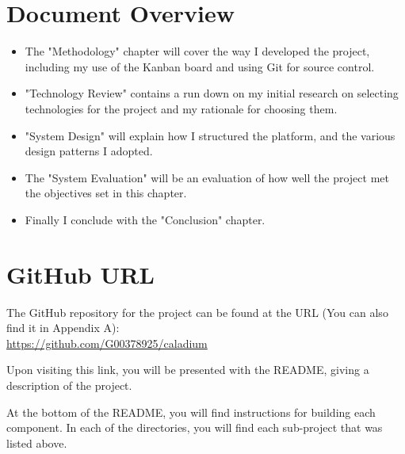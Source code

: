 
\section{Document Overview}
\begin{itemize}
  \item The "Methodology" chapter will cover the way I developed the project,
  including my use of the Kanban board and using Git for source control.
  \item "Technology Review" contains a run down on my initial research on selecting
  technologies for the project and my rationale for choosing them.
  \item "System Design" will explain how I structured the platform,
  and the various design patterns I adopted.
  \item The "System Evaluation" will be an evaluation of how well
  the project met the objectives set in this chapter.
  \item Finally I conclude with the "Conclusion" chapter.
\end{itemize}

\section{GitHub URL}
The GitHub repository for the project can be found at the URL
(You can also find it in Appendix A):\\
\href{https://github.com/G00378925/caladium}{https://github.com/G00378925/caladium}

Upon visiting this link,
you will be presented with the README,
giving a description of the project.

At the bottom of the README,
you will find instructions for building each component.
In each of the directories,
you will find each sub-project that was listed above.
